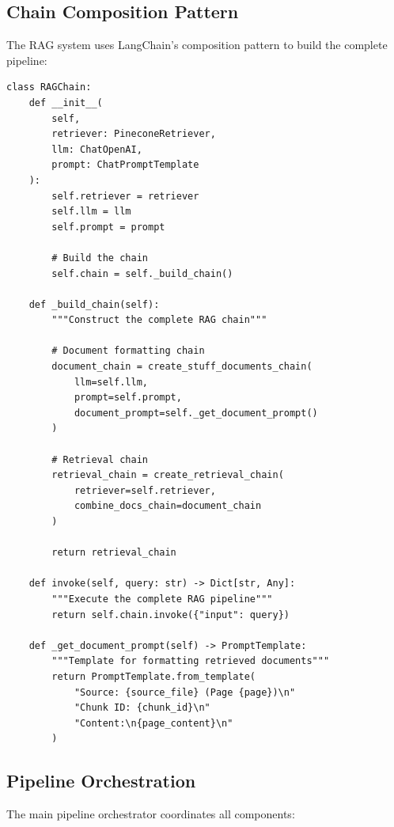 \documentclass[12pt,a4paper]{article}
\begin{document}
\subsection{Chain Composition Pattern}

The RAG system uses LangChain's composition pattern to build the complete pipeline:

\begin{lstlisting}[caption=RAG Chain Implementation]
class RAGChain:
    def __init__(
        self,
        retriever: PineconeRetriever,
        llm: ChatOpenAI,
        prompt: ChatPromptTemplate
    ):
        self.retriever = retriever
        self.llm = llm
        self.prompt = prompt
        
        # Build the chain
        self.chain = self._build_chain()
    
    def _build_chain(self):
        """Construct the complete RAG chain"""
        
        # Document formatting chain
        document_chain = create_stuff_documents_chain(
            llm=self.llm,
            prompt=self.prompt,
            document_prompt=self._get_document_prompt()
        )
        
        # Retrieval chain
        retrieval_chain = create_retrieval_chain(
            retriever=self.retriever,
            combine_docs_chain=document_chain
        )
        
        return retrieval_chain
    
    def invoke(self, query: str) -> Dict[str, Any]:
        """Execute the complete RAG pipeline"""
        return self.chain.invoke({"input": query})
    
    def _get_document_prompt(self) -> PromptTemplate:
        """Template for formatting retrieved documents"""
        return PromptTemplate.from_template(
            "Source: {source_file} (Page {page})\n"
            "Chunk ID: {chunk_id}\n"
            "Content:\n{page_content}\n"
        )
\end{lstlisting}

\subsection{Pipeline Orchestration}

The main pipeline orchestrator coordinates all components:
\end{document}

